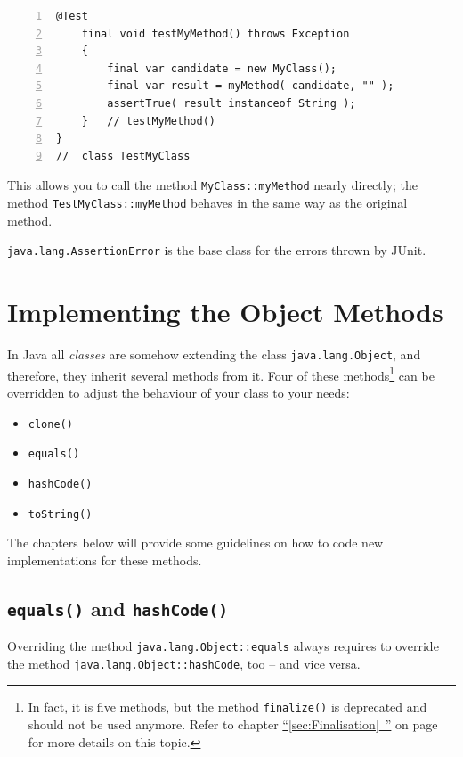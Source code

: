 \documentclass[11pt,a4paper, titlepage, parskip=half, headsepline, footsepline, cleardoublepage=current, headheight=1cm]{scrbook}
\newcommand*{\tqfullvref}[1]{\hyperref[{#1}]{“\ref*{#1}~\nameref*{#1}”} on page~\pageref{#1}}
\begin{document}
\begin{lstlisting}[numbers=left]
    @Test
    final void testMyMethod() throws Exception
    {
        final var candidate = new MyClass();
        final var result = myMethod( candidate, "" );
        assertTrue( result instanceof String );
    }   // testMyMethod()
}
//  class TestMyClass  
\end{lstlisting}
This allows you to call the method \lstinline|MyClass::myMethod| nearly directly; the method \lstinline|TestMyClass::myMethod| behaves in the same way as the original method.

\lstinline|java.lang.AssertionError|\autocite{ORACLE_DOC_ASSERTIONERROR_CLASS} is the base class for the errors thrown by JUnit\autocite{JUNIT5}.

\section{Implementing the Object Methods}
In Java all \textit{classes} are somehow extending the class \lstinline|java.lang.Object|\autocite{ORACLE_DOC_OBJECT_CLASS}, and therefore, they inherit several methods from it. Four of these methods\footnote{In fact, it is five methods, but the method \lstinline|finalize()|\autocite{ORACLE_DOC_OBJECT:finalize} is deprecated and should not be used anymore. Refer to chapter \tqfullvref{sec:Finalisation} for more details on this topic.} can be overridden to adjust the behaviour of your class to your needs:
\begin{itemize}[nosep]
\item{\lstinline|clone()|\autocite{ORACLE_DOC_OBJECT:clone}}
\item{\lstinline|equals()|\autocite{ORACLE_DOC_OBJECT:equals}}
\item{\lstinline|hashCode()|\autocite{ORACLE_DOC_OBJECT:hashCode}}
\item{\lstinline|toString()|\autocite{ORACLE_DOC_OBJECT:toString}}
\end{itemize}

The chapters below will provide some guidelines on how to code new implementations for these methods.

\subsection{\lstinline|equals()| and \lstinline|hashCode()|}\label{sec:EqualsAndHashCode}
Overriding the method \lstinline|java.lang.Object::equals|\autocite{ORACLE_DOC_OBJECT:equals} always requires to override the method \lstinline|java.lang.Object::hashCode|\autocite{ORACLE_DOC_OBJECT:hashCode}, too – and vice versa.
\end{document}
